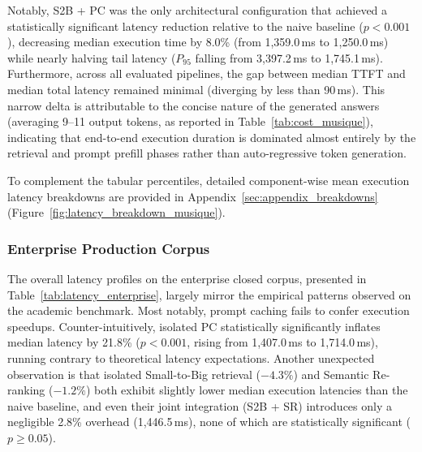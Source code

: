Notably, S2B + PC was the only architectural configuration that achieved a statistically significant latency reduction relative to the naive baseline ($p < 0.001$), decreasing median execution time by 8.0\% (from 1,359.0\,ms to 1,250.0\,ms) while nearly halving tail latency ($P_{95}$ falling from 3,397.2\,ms to 1,745.1\,ms). Furthermore, across all evaluated pipelines, the gap between median TTFT and median total latency remained minimal (diverging by less than 90\,ms). This narrow delta is attributable to the concise nature of the generated answers (averaging 9--11 output tokens, as reported in Table~\ref{tab:cost_musique}), indicating that end-to-end execution duration is dominated almost entirely by the retrieval and prompt prefill phases rather than auto-regressive token generation.

To complement the tabular percentiles, detailed component-wise mean execution latency breakdowns are provided in Appendix~\ref{sec:appendix_breakdowns} (Figure~\ref{fig:latency_breakdown_musique}).

\subsubsection{Enterprise Production Corpus}
\label{subsubsec:latency_enterprise}

The overall latency profiles on the enterprise closed corpus, presented in Table~\ref{tab:latency_enterprise}, largely mirror the empirical patterns observed on the academic benchmark. Most notably, prompt caching fails to confer execution speedups. Counter-intuitively, isolated PC statistically significantly inflates median latency by 21.8\% ($p < 0.001$, rising from 1,407.0\,ms to 1,714.0\,ms), running contrary to theoretical latency expectations. Another unexpected observation is that isolated Small-to-Big retrieval ($-4.3\%$) and Semantic Re-ranking ($-1.2\%$) both exhibit slightly lower median execution latencies than the naive baseline, and even their joint integration (S2B + SR) introduces only a negligible 2.8\% overhead (1,446.5\,ms), none of which are statistically significant ($p \ge 0.05$). 



